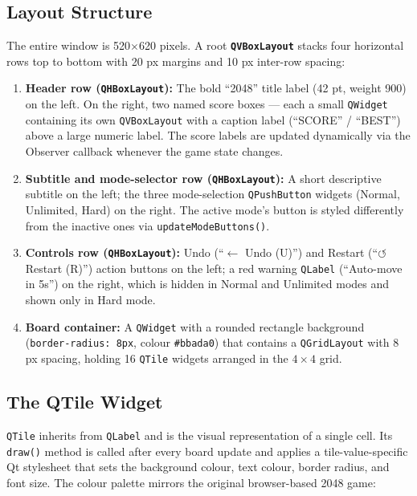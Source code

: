 \documentclass[a4paper,12pt]{article}
\begin{document}
\subsection{Layout Structure}

The entire window is 520$\times$620 pixels. A root \textbf{\texttt{QVBoxLayout}} stacks four horizontal rows top to bottom with 20 px margins and 10 px inter-row spacing:

\begin{enumerate}
    \item \textbf{Header row (\texttt{QHBoxLayout}):} The bold ``2048'' title label (42 pt, weight 900) on the left. On the right, two named score boxes --- each a small \texttt{QWidget} containing its own \texttt{QVBoxLayout} with a caption label (``SCORE'' / ``BEST'') above a large numeric label. The score labels are updated dynamically via the Observer callback whenever the game state changes.

    \item \textbf{Subtitle and mode-selector row (\texttt{QHBoxLayout}):} A short descriptive subtitle on the left; the three mode-selection \texttt{QPushButton} widgets (Normal, Unlimited, Hard) on the right. The active mode's button is styled differently from the inactive ones via \texttt{updateModeButtons()}.

    \item \textbf{Controls row (\texttt{QHBoxLayout}):} Undo (``$\leftarrow$ Undo (U)'') and Restart (``$\circlearrowleft$ Restart (R)'') action buttons on the left; a red warning \texttt{QLabel} (``Auto-move in 5s'') on the right, which is hidden in Normal and Unlimited modes and shown only in Hard mode.

    \item \textbf{Board container:} A \texttt{QWidget} with a rounded rectangle background (\texttt{border-radius: 8px}, colour \texttt{\#bbada0}) that contains a \texttt{QGridLayout} with 8 px spacing, holding 16 \texttt{QTile} widgets arranged in the $4 \times 4$ grid.
\end{enumerate}

\subsection{The QTile Widget}

\texttt{QTile} inherits from \texttt{QLabel} and is the visual representation of a single cell. Its \texttt{draw()} method is called after every board update and applies a tile-value-specific Qt stylesheet that sets the background colour, text colour, border radius, and font size. The colour palette mirrors the original browser-based 2048 game:
\end{document}
